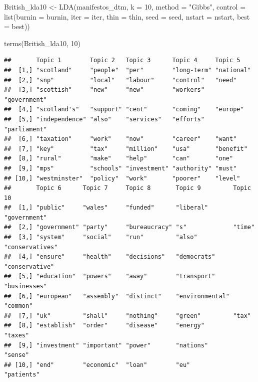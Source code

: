\documentclass[
]{book}
\newenvironment{Shaded}{\begin{snugshade}}{\end{snugshade}}
\newcommand{\AttributeTok}[1]{\textcolor[rgb]{0.77,0.63,0.00}{#1}}
\newcommand{\DecValTok}[1]{\textcolor[rgb]{0.00,0.00,0.81}{#1}}
\newcommand{\FunctionTok}[1]{\textcolor[rgb]{0.00,0.00,0.00}{#1}}
\newcommand{\NormalTok}[1]{#1}
\newcommand{\OtherTok}[1]{\textcolor[rgb]{0.56,0.35,0.01}{#1}}
\newcommand{\StringTok}[1]{\textcolor[rgb]{0.31,0.60,0.02}{#1}}
\begin{document}
\begin{Shaded}
\begin{Highlighting}[]
\NormalTok{British\_lda10 }\OtherTok{\textless{}{-}} \FunctionTok{LDA}\NormalTok{(manifestos\_dtm, }\AttributeTok{k =} \DecValTok{10}\NormalTok{, }\AttributeTok{method =} \StringTok{"Gibbs"}\NormalTok{, }
    \AttributeTok{control =} \FunctionTok{list}\NormalTok{(}\AttributeTok{burnin =}\NormalTok{ burnin, }\AttributeTok{iter =}\NormalTok{ iter, }\AttributeTok{thin =}\NormalTok{ thin, }
        \AttributeTok{seed =}\NormalTok{ seed, }\AttributeTok{nstart =}\NormalTok{ nstart, }\AttributeTok{best =}\NormalTok{ best))}

\FunctionTok{terms}\NormalTok{(British\_lda10, }\DecValTok{10}\NormalTok{)}
\end{Highlighting}
\end{Shaded}

\begin{verbatim}
##       Topic 1        Topic 2   Topic 3      Topic 4     Topic 5     
##  [1,] "scotland"     "people"  "per"        "long-term" "national"  
##  [2,] "snp"          "local"   "labour"     "control"   "need"      
##  [3,] "scottish"     "new"     "new"        "workers"   "government"
##  [4,] "scotland's"   "support" "cent"       "coming"    "europe"    
##  [5,] "independence" "also"    "services"   "efforts"   "parliament"
##  [6,] "taxation"     "work"    "now"        "career"    "want"      
##  [7,] "key"          "tax"     "million"    "usa"       "benefit"   
##  [8,] "rural"        "make"    "help"       "can"       "one"       
##  [9,] "mps"          "schools" "investment" "authority" "must"      
## [10,] "westminster"  "policy"  "work"       "poorer"    "level"     
##       Topic 6      Topic 7     Topic 8       Topic 9         Topic 10       
##  [1,] "public"     "wales"     "funded"      "liberal"       "government"   
##  [2,] "government" "party"     "bureaucracy" "s"             "time"         
##  [3,] "system"     "social"    "run"         "also"          "conservatives"
##  [4,] "ensure"     "health"    "decisions"   "democrats"     "conservative" 
##  [5,] "education"  "powers"    "away"        "transport"     "businesses"   
##  [6,] "european"   "assembly"  "distinct"    "environmental" "common"       
##  [7,] "uk"         "shall"     "nothing"     "green"         "tax"          
##  [8,] "establish"  "order"     "disease"     "energy"        "taxes"        
##  [9,] "investment" "important" "power"       "nations"       "sense"        
## [10,] "end"        "economic"  "loan"        "eu"            "patients"
\end{verbatim}
\end{document}

